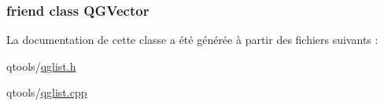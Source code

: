 \subsubsection[{Q\+G\+Vector}]{\setlength{\rightskip}{0pt plus 5cm}friend class {\bf Q\+G\+Vector}\hspace{0.3cm}{\ttfamily [friend]}}\label{class_q_g_list_add83e2909bfdb7817ab2363440f946de}


La documentation de cette classe a été générée à partir des fichiers suivants \+:\begin{DoxyCompactItemize}
\item 
qtools/\hyperlink{qglist_8h}{qglist.\+h}\item 
qtools/\hyperlink{qglist_8cpp}{qglist.\+cpp}\end{DoxyCompactItemize}
